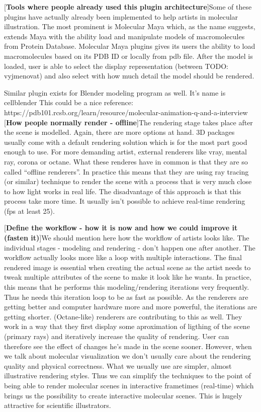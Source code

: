 \documentclass[
  digital, %
  table,   %
  nolof,     %
  nolot,     %
]{fithesis3}
\begin{document}
[\textbf{Tools where people already used this plugin architecture}]Some of these plugins have actually already been implemented to help artists in molecular illustration. The most prominent is Molecular Maya which, as the name suggests, extends Maya with the ability load and manipulate models of macromolecules from Protein Database. Molecular Maya plugins gives its users the ability to load macromolecules based on its PDB ID or locally from pdb file. After the model is loaded, user is able to select the display representation (between TODO: vyjmenovat) and also select with how much detail the model should be rendered.

Similar plugin exists for Blender modeling program as well. It's name is cellblender
This could be a nice reference: https://pdb101.rcsb.org/learn/resource/molecular-animation-q-and-a-interview
[\textbf{How people normally render - offline}]The rendering stage takes place after the scene is modelled. Again, there are more options at hand. 3D packages usually come with a default rendering solution which is for the most part good enough to use. For more demanding artist, external renderers like vray, mental ray, corona or octane. What these renderes have in common is that they are so called ``offline renderers''. In practice this means that they are using ray tracing (or similar) technique to render the scene with a process that is very much close to how light works in real life. The disadvantage of this approach is that this process take more time. It usually isn't possible to achieve real-time rendering (fps at least 25).

[\textbf{Define the workflow - how it is now and how we could improve it (fasten it)}]We should mention here how the workflow of artists looks like. The individual stages - modeling and rendering - don't happen one after another. The workflow actually looks more like a loop with multiple interactions. The final rendered image is essential when creating the actual scene as the artist needs to tweak multiple attributes of the scene to make it look like he wants. In practice, this means that he performs this modeling/rendering iterations very frequently. Thus he needs this iteration loop to be as fast as possible. As the renderers are getting better and computer hardware more and more powerful, the iterations are getting shorter. (Octane-like) renderers are contributing to this as well. They work in a way that they first display some aproximation of ligthing of the scene (primary rays) and iteratively increase the quality of rendering. User can therefore see the effect of changes he's made in the scene sooner. However, when we talk about molecular visualization we don't usually care about the rendering quality and physical correctness. What we usually use are simpler, almost illustrative rendering styles. Thus we can simplify the techniques to the point of being able to render molecular scenes in interactive frametimes (real-time) which brings us the possibility to create interactive molecular scenes. This is hugely attractive for scientific illustrators.
\end{document}
